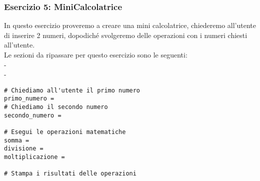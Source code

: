 \subsubsection{Esercizio 5: MiniCalcolatrice}\label{esercizioFond:5}
In questo esercizio proveremo a creare una mini calcolatrice, chiederemo all'utente di inserire 2 numeri, dopodiché svolgeremo delle operazioni con i numeri chiesti all'utente.\\
Le sezioni da ripassare per questo esercizio sono le seguenti:\\
- \\
- 
\vspace{0.3cm}
\begin{lstlisting}
# Chiediamo all'utente il primo numero
primo_numero = 
# Chiediamo il secondo numero
secondo_numero = 

# Esegui le operazioni matematiche
somma =
divisione = 
moltiplicazione = 

# Stampa i risultati delle operazioni
\end{lstlisting}

